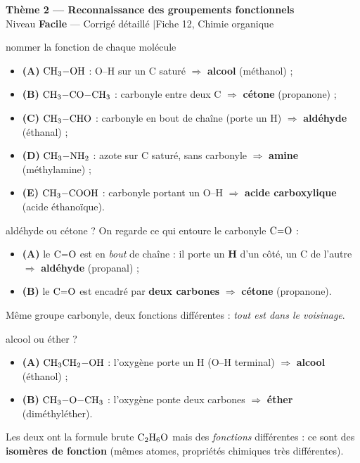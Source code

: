 \documentclass[11pt,a4paper]{article}
\newcommand{\rep}[1]{\textcolor{primarydark}{\textbf{#1}}}
\newcommand{\banner}[2]{%
\begin{tcolorbox}[enhanced,colback=excol,colframe=excol,arc=5pt,boxrule=0pt,
   left=5mm,right=5mm,top=2.5mm,bottom=2.5mm,coltext=white]
{\large\bfseries #1}\\[1pt]{\small #2}
\end{tcolorbox}\vspace{2pt}}
\begin{document}
\banner{Thème 2 — Reconnaissance des groupements fonctionnels}{Niveau \textbf{Facile} — Corrigé détaillé \quad$\vert$\quad Fiche 12, Chimie organique}

\begin{corr}{nommer la fonction de chaque molécule}
\begin{itemize}[leftmargin=1.6em,itemsep=1pt]
  \item \textbf{(A)} $\ce{CH3-OH}$ : O--H sur un C saturé $\Rightarrow$ \rep{alcool} (méthanol) ;
  \item \textbf{(B)} $\ce{CH3-CO-CH3}$ : carbonyle entre deux C $\Rightarrow$ \rep{cétone} (propanone) ;
  \item \textbf{(C)} $\ce{CH3-CHO}$ : carbonyle en bout de chaîne (porte un H) $\Rightarrow$ \rep{aldéhyde} (éthanal) ;
  \item \textbf{(D)} $\ce{CH3-NH2}$ : azote sur C saturé, sans carbonyle $\Rightarrow$ \rep{amine} (méthylamine) ;
  \item \textbf{(E)} $\ce{CH3-COOH}$ : carbonyle portant un O--H $\Rightarrow$ \rep{acide carboxylique} (acide éthanoïque).
\end{itemize}
\end{corr}

\begin{corr}{aldéhyde ou cétone ?}
On regarde ce qui entoure le carbonyle $\ce{C=O}$ :
\begin{itemize}[leftmargin=1.6em,itemsep=1pt]
  \item \textbf{(A)} le $\ce{C=O}$ est en \emph{bout} de chaîne : il porte un \textbf{H} d'un côté, un C de l'autre $\Rightarrow$ \rep{aldéhyde} (propanal) ;
  \item \textbf{(B)} le $\ce{C=O}$ est encadré par \textbf{deux carbones} $\Rightarrow$ \rep{cétone} (propanone).
\end{itemize}
Même groupe carbonyle, deux fonctions différentes : \emph{tout est dans le voisinage}.
\end{corr}

\begin{corr}{alcool ou éther ?}
\begin{itemize}[leftmargin=1.6em,itemsep=1pt]
  \item \textbf{(A)} $\ce{CH3CH2-OH}$ : l'oxygène porte un H (O--H terminal) $\Rightarrow$ \rep{alcool} (éthanol) ;
  \item \textbf{(B)} $\ce{CH3-O-CH3}$ : l'oxygène ponte deux carbones $\Rightarrow$ \rep{éther} (diméthyléther).
\end{itemize}
Les deux ont la formule brute $\ce{C2H6O}$ mais des \emph{fonctions} différentes : ce sont des \rep{isomères de fonction} (mêmes atomes, propriétés chimiques très différentes).
\end{corr}
\end{document}
